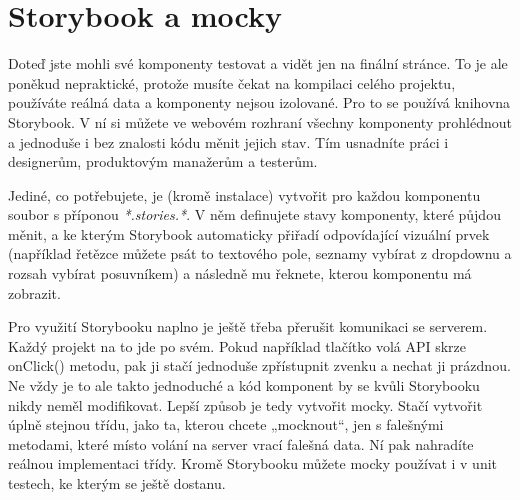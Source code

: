 \section{Storybook a mocky}

Doteď jste mohli své komponenty testovat a vidět jen na finální stránce. To je ale poněkud nepraktické, protože musíte čekat na kompilaci celého projektu, používáte reálná data a komponenty nejsou izolované. Pro to se používá knihovna Storybook. V ní si můžete ve webovém rozhraní všechny komponenty prohlédnout a jednoduše i bez znalosti kódu měnit jejich stav. Tím usnadníte práci i designerům, produktovým manažerům a testerům.

Jediné, co potřebujete, je (kromě instalace) vytvořit pro každou komponentu soubor s příponou \textit{*.stories.*}. V něm definujete stavy komponenty, které půjdou měnit, a ke kterým Storybook automaticky přiřadí odpovídající vizuální prvek (například řetězce můžete psát to textového pole, seznamy vybírat z dropdownu a rozsah vybírat posuvníkem) a následně mu řeknete, kterou komponentu má zobrazit.

Pro využití Storybooku naplno je ještě třeba přerušit komunikaci se serverem. Každý projekt na to jde po svém. Pokud například tlačítko volá API skrze onClick() metodu, pak ji stačí jednoduše zpřístupnit zvenku a nechat ji prázdnou. Ne vždy je to ale takto jednoduché a kód komponent by se kvůli Storybooku nikdy neměl modifikovat. Lepší způsob je tedy vytvořit mocky\cite{Mocks}. Stačí vytvořit úplně stejnou třídu, jako ta, kterou chcete „mocknout“, jen s falešnými metodami, které místo volání na server vrací falešná data. Ní pak nahradíte reálnou implementaci třídy. Kromě Storybooku můžete mocky používat i v unit testech, ke kterým se ještě dostanu.